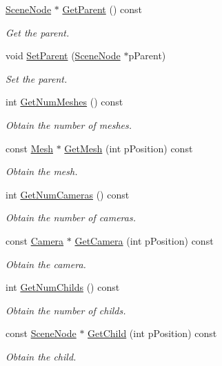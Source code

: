 \begin{DoxyCompactItemize}
\hyperlink{class_scene_node}{Scene\+Node} $\ast$ \hyperlink{class_scene_node_a53aba5c8a4e8cc31735c6b8c6a30e9f0}{Get\+Parent} () const 
\begin{DoxyCompactList}\small\item\em Get the parent. \end{DoxyCompactList}\item 
void \hyperlink{class_scene_node_ad1a4820022772a7be4fc85509a170fa3}{Set\+Parent} (\hyperlink{class_scene_node}{Scene\+Node} $\ast$p\+Parent)
\begin{DoxyCompactList}\small\item\em Set the parent. \end{DoxyCompactList}\item 
int \hyperlink{class_scene_node_aa3ddf1a8e213d816a63c2b34448fbdf5}{Get\+Num\+Meshes} () const 
\begin{DoxyCompactList}\small\item\em Obtain the number of meshes. \end{DoxyCompactList}\item 
const \hyperlink{class_mesh}{Mesh} $\ast$ \hyperlink{class_scene_node_af3e49f6cf2fb7b4f42f5999ce052510e}{Get\+Mesh} (int p\+Position) const 
\begin{DoxyCompactList}\small\item\em Obtain the mesh. \end{DoxyCompactList}\item 
int \hyperlink{class_scene_node_a6625dcbebbce366e7fcf5544df71f2b1}{Get\+Num\+Cameras} () const 
\begin{DoxyCompactList}\small\item\em Obtain the number of cameras. \end{DoxyCompactList}\item 
const \hyperlink{class_camera}{Camera} $\ast$ \hyperlink{class_scene_node_abc04a1526fd66a7689ce704e34d0920b}{Get\+Camera} (int p\+Position) const 
\begin{DoxyCompactList}\small\item\em Obtain the camera. \end{DoxyCompactList}\item 
int \hyperlink{class_scene_node_aa7fed4b6f2c3624c8cbbc8373ee80559}{Get\+Num\+Childs} () const 
\begin{DoxyCompactList}\small\item\em Obtain the number of childs. \end{DoxyCompactList}\item 
const \hyperlink{class_scene_node}{Scene\+Node} $\ast$ \hyperlink{class_scene_node_abd11242715742498f9fdc2580cc94467}{Get\+Child} (int p\+Position) const 
\begin{DoxyCompactList}\small\item\em Obtain the child. \end{DoxyCompactList}\end{DoxyCompactItemize}
